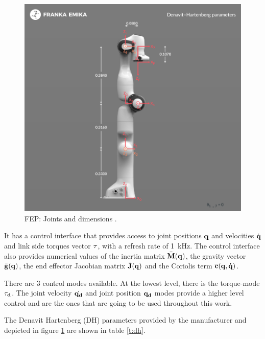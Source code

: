 \begin{figure}[H]
    \caption[FEP's kinematic chain]{
        FEP: Joints and dimensions \cite{FrankaEmikaPanda}.
    }
    \begin{center}
    \includegraphics[width=\textwidth]{figs/panda-dh-diagram.png}
    \end{center}
\label{fig:FEPchain}
\end{figure}

It has a control interface that provides access to joint positions $\bf{q}$ and velocities $\dot{\bf{q}}$ and link side torques vector $\bf{\tau}$, with a refresh rate of \SI{1}{\kilo\hertz}. The control interface also provides numerical values of the inertia matrix \(\bar{\bf{M}}(\bf{q})\), the gravity vector \( \bar{\bf{g}}(\bf{q}) \), the end effector Jacobian matrix \( \bar{\bf{J}}(\bf{q}) \) and the Coriolis term \( \overline{\bf{c}}(\bf{q}, \dot{\bf{q}}) \).

There are 3 control modes available. At the lowest level, there is the torque-mode $\bf{\tau_d}$. The joint velocity $\dot{\bf{q_d}}$ and joint position $\bf{q_d}$ modes provide a higher level control and are the ones that are going to be used throughout this work.

The Denavit Hartenberg (DH) parameters provided by the manufacturer \cite{FrankaEmikaPanda} and depicted in figure \ref{fig:FEPchain} are shown in table \ref{t:dh}.

